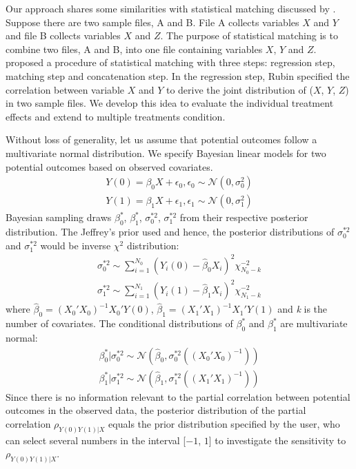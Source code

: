 	Our approach shares some similarities with statistical matching discussed by \citet{moriarity2003note}. Suppose there are two sample files, A and B. File A collects variables $X$ and $Y$ and file B collects variables $X$ and $Z$. The purpose of statistical matching is to combine two files, A and B, into one file containing variables $X$, $Y$ and $Z$. \citet{rubin1986statistical} proposed a procedure of statistical matching with three steps: regression step, matching step and concatenation step. In the regression step, Rubin specified the correlation between variable $X$ and $Y$ to derive the joint distribution of ($X$, $Y$, $Z$) in two sample files. We develop this idea to evaluate the individual treatment effects and extend to multiple treatments condition.  
	  
	
	Without loss of generality, let us assume that potential outcomes follow a multivariate normal distribution. We specify Bayesian linear models for two potential outcomes based on observed covariates. 
	\begin{align}
		Y(0) = \beta_{0}X + \epsilon_{0}, \epsilon_{0} \sim \mathcal{N}(0, \sigma_{0}^2)\\
		Y(1) = \beta_{1}X + \epsilon_{1}, \epsilon_{1} \sim \mathcal{N}(0, \sigma_{1}^2)
	\end{align}
	Bayesian sampling draws $\beta_{0}^{*}$, $\beta_{1}^{*}$, $\sigma_{0}^{*2}$, $\sigma_{1}^{*2}$ from their respective posterior distribution. The Jeffrey's prior used and hence, the posterior distributions of $\sigma_{0}^{*2}$ and $\sigma_{1}^{*2}$ would be inverse $\chi^2$ distribution:
	\begin{align}
		\sigma_{0}^{*2} \sim \sum_{i = 1}^{N_{0}}(Y_i(0) - \hat{\beta}_{0}X_{i})^2\chi_{N_{0} - k}^{-2}\\
		\sigma_{1}^{*2} \sim \sum_{i = 1}^{N_{1}}(Y_i(1) - \hat{\beta}_{1}X_{i})^2\chi_{N_{1} - k}^{-2}
	\end{align}
	where $\hat{\beta}_{0} = (X_{0}'X_{0})^{-1}X_{0}'Y(0)$, $\hat{\beta}_{1} = (X_{1}'X_{1})^{-1}X_{1}'Y(1)$ and \emph{k} is the number of covariates. The conditional distributions of  $\beta_{0}^{*}$ and $\beta_{1}^{*}$ are multivariate normal:
	\begin{align}
		\beta_{0}^{*} | \sigma_{0}^{*2} \sim \mathcal{N}(\hat{\beta}_{0}, \sigma_{0}^{*2}((X_{0}'X_{0})^{-1}))\\
		\beta_{1}^{*} | \sigma_{1}^{*2} \sim \mathcal{N}(\hat{\beta}_{1}, \sigma_{1}^{*2}((X_{1}'X_{1})^{-1}))
	\end{align}
	Since there is no information relevant to the partial correlation between potential outcomes in the observed data, the posterior distribution of the partial correlation $\rho_{Y(0)Y(1)|X}$ equals the prior distribution specified by the user, who can select several numbers in the interval [$-1$, $1$] to investigate the sensitivity to $\rho_{Y(0)Y(1)|X}$. 
